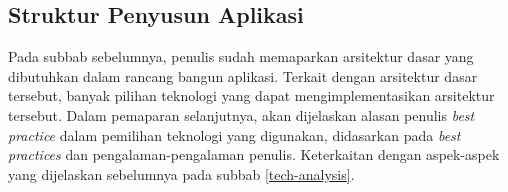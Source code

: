 
\subsection{Struktur Penyusun Aplikasi}
\label{software-structure}

	Pada subbab sebelumnya, penulis sudah memaparkan arsitektur dasar yang dibutuhkan dalam rancang bangun aplikasi. Terkait dengan arsitektur dasar tersebut, banyak pilihan teknologi yang dapat mengimplementasikan arsitektur tersebut. Dalam pemaparan selanjutnya, akan dijelaskan alasan penulis \textit{best practice} dalam pemilihan teknologi yang digunakan, didasarkan pada \textit{best practices} dan pengalaman-pengalaman penulis. Keterkaitan dengan aspek-aspek yang dijelaskan sebelumnya pada subbab \ref{tech-analysis}.
	
	

	
	
	